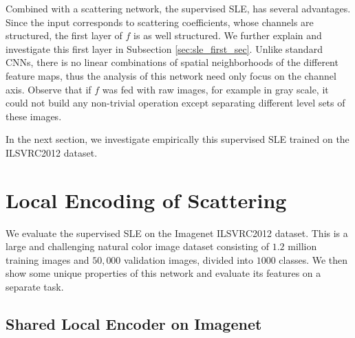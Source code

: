 \documentclass[10pt,twocolumn,letterpaper]{article}
\begin{document}
Combined with a scattering network, the supervised SLE, has several advantages. Since the input corresponds to scattering coefficients, whose channels are structured, the first layer of $f$ is as well structured. We further explain and investigate this first layer in Subsection \ref{sec:sle_first_sec}. Unlike standard CNNs, there is no linear combinations of spatial neighborhoods of the different feature maps, thus the analysis of this network need only focus on the channel axis.  Observe that if $f$ was fed with raw images, for example in gray scale, it could not build any non-trivial operation except separating different level sets of these images.  


In the next section, we investigate empirically this supervised SLE trained on the ILSVRC2012 dataset.















 





\section{Local Encoding of Scattering}
\label{sle_sec}
We evaluate the supervised SLE on the Imagenet ILSVRC2012 dataset. This is a large and challenging natural color image dataset consisting of $1.2$ million training images and $50,000$ validation images, divided into $1000$ classes. We then show some unique properties of this network and evaluate its features on a separate task.
\subsection{Shared Local Encoder on Imagenet}
\label{sec:sle_exp}
\end{document}
